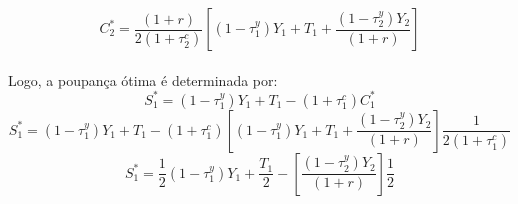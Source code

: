 \documentclass{article}
\begin{document}
\begin{equation}\label{eq:14ac2star}
    C_2^* = \frac{(1+r)}{2(1+\tau_2^c)}\left[(1-\tau_1^y)Y_1 + T_1 + \frac{(1-\tau_2^y)Y_2}{(1+r)}\right]
\end{equation}
\\
Logo, a poupança ótima é determinada por:
\begin{equation}
    S_1^* = (1-\tau_1^y)Y_1 + T_1 - (1+\tau_1^c)C_1^*
\end{equation}
\begin{equation}
    S_1^* = (1-\tau_1^y)Y_1 + T_1 - (1+\tau_1^c)\left[(1-\tau_1^y)Y_1 + T_1 + \frac{(1-\tau_2^y)Y_2}{(1+r)}\right]\frac{1}{2(1+\tau_1^c)}
\end{equation}
\begin{equation}
    S_1^* = \frac{1}{2}(1-\tau_1^y)Y_1 + \frac{T_1}{2} - \left[\frac{(1-\tau_2^y)Y_2}{(1+r)}\right]\frac{1}{2}
\end{equation}
\end{document}
